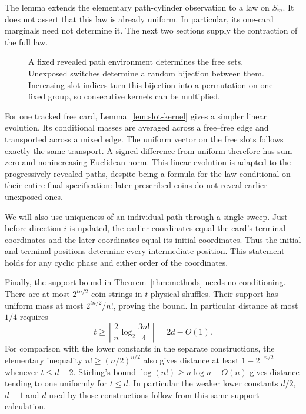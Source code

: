 The lemma extends the elementary path-cylinder observation to a law on $S_m$. It does not assert that this law is already uniform. In particular, its one-card marginals need not determine it. The next two sections supply the contraction of the full law.

\begin{figure}[ht]
\centering
{}
\caption{A fixed revealed path environment determines the free sets. Unexposed switches determine a random bijection between them. Increasing slot indices turn this bijection into a permutation on one fixed group, so consecutive kernels can be multiplied.}
\label{fig:slots}
\end{figure}

For one tracked free card, Lemma~\ref{lem:slot-kernel} gives a simpler linear evolution. Its conditional masses are averaged across a free--free edge and transported across a mixed edge. The uniform vector on the free slots follows exactly the same transport. A signed difference from uniform therefore has sum zero and nonincreasing Euclidean norm. This linear evolution is adapted to the progressively revealed paths, despite being a formula for the law conditional on their entire final specification: later prescribed coins do not reveal earlier unexposed ones.

We will also use uniqueness of an individual path through a single sweep. Just before direction $i$ is updated, the earlier coordinates equal the card's terminal coordinates and the later coordinates equal its initial coordinates. Thus the initial and terminal positions determine every intermediate position. This statement holds for any cyclic phase and either order of the coordinates.

Finally, the support bound in Theorem~\ref{thm:methods} needs no conditioning. There are at most $2^{tn/2}$ coin strings in $t$ physical shuffles. Their support has uniform mass at most $2^{tn/2}/n!$, proving the bound. In particular distance at most $1/4$ requires
\[
 t\ge\left\lceil\frac2n\log_2\frac{3n!}{4}\right\rceil
       =2d-O(1).
\]
For comparison with the lower constants in the separate constructions, the elementary inequality $n!\ge(n/2)^{n/2}$ also gives distance at least $1-2^{-n/2}$ whenever $t\le d-2$. Stirling's bound $\log(n!)\ge n\log n-O(n)$ gives distance tending to one uniformly for $t\le d$. In particular the weaker lower constants $d/2$, $d-1$ and $d$ used by those constructions follow from this same support calculation.

